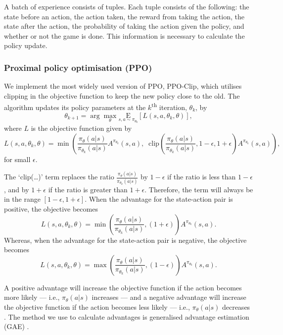 \documentclass[12pt,a4paper]{article}
\begin{document}
A batch of experience consists of tuples. Each tuple consists of the following: the state before an action, the action taken, the reward from taking the action, the state after the action, the probability of taking the action given the policy, and whether or not the game is done. This information is necessary to calculate the policy update.


\subsubsection{Proximal policy optimisation (PPO)}
We implement the most widely used version of PPO, PPO-Clip, which utilises clipping in the objective function to keep the new policy close to the old. The algorithm updates its policy parameters at the $k$\textsuperscript{th} iteration, $\theta_k$,  by \[\theta_{k+1} = \arg \max_{\theta} \underset{s,a \sim \pi_{\theta_k}}{{\mathrm E}}\left[L(s,a,\theta_k, \theta)\right],\] where $L$ is the objective function given by \[L(s,a,\theta_k,\theta) = \min\left(\frac{\pi_{\theta}(a|s)}{\pi_{\theta_k}(a|s)}  A^{\pi_{\theta_k}}(s,a), \;\;\text{clip}\left(\frac{\pi_{\theta}(a|s)}{\pi_{\theta_k}(a|s)}, 1 - \epsilon, 1+\epsilon \right) A^{\pi_{\theta_k}}(s,a) \right),\] for small $\epsilon$. 

The `clip(\dots)' term replaces the ratio $\frac{\pi_{\theta}(a|s)}{\pi_{\theta_k}(a|s)}$ by $1 - \epsilon$ if the ratio is less than $1 - \epsilon$, and by $1 + \epsilon$ if the ratio is greater than $1 + \epsilon$. Therefore, the term will always be in the range $\left[1 - \epsilon, 1 + \epsilon \right]$. When the advantage for the state-action pair is positive, the objective becomes \[L(s,a,\theta_k,\theta) = \min\left(\frac{\pi_{\theta}(a|s)}{\pi_{\theta_k}(a|s)}, (1 + \epsilon) \right)  A^{\pi_{\theta_k}}(s,a).\] Whereas, when the advantage for the state-action pair is negative, the objective becomes \[L(s,a,\theta_k,\theta) = \max\left(\frac{\pi_{\theta}(a|s)}{\pi_{\theta_k}(a|s)}, (1 - \epsilon) \right)  A^{\pi_{\theta_k}}(s,a).\]

A positive advantage will increase the objective function if the action becomes more likely --- i.e., \(\pi_{\theta}(a|s)\) increases --- and a negative advantage will increase the objective function if the action becomes less likely --- i.e., \(\pi_{\theta}(a|s)\) decreases \cite{SpinningUp2018}. The method we use to calculate advantages is generalised advantage estimation (GAE) \cite{schulman2018highdimensional}.
\end{document}
